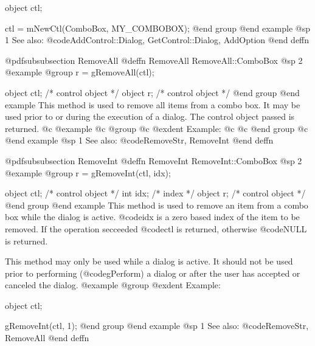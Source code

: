 object  ctl;

ctl = mNewCtl(ComboBox, MY_COMBOBOX);
@end group
@end example
@sp 1
See also:  @code{AddControl::Dialog, GetControl::Dialog, AddOption}
@end deffn




















@pdfsubsubsection {RemoveAll}
@deffn {RemoveAll} RemoveAll::ComboBox
@sp 2
@example
@group
r = gRemoveAll(ctl);

object  ctl;    /*  control object  */
object  r;      /*  control object  */
@end group
@end example
This method is used to remove all items from a combo box.  It may be used
prior to or during the execution of a dialog.  The control object passed
is returned.
@c @example
@c @group
@c @exdent Example:
@c 
@c @end group
@c @end example
@sp 1
See also:  @code{RemoveStr, RemoveInt}
@end deffn

















@pdfsubsubsection {RemoveInt}
@deffn {RemoveInt} RemoveInt::ComboBox
@sp 2
@example
@group
r = gRemoveInt(ctl, idx);

object  ctl;    /*  control object  */
int     idx;    /*  index           */
object  r;      /*  control object  */
@end group
@end example
This method is used to remove an item from a combo box while the dialog
is active.  @code{idx} is a zero based index of the item to be removed.
If the operation secceeded @code{ctl} is returned, otherwise @code{NULL}
is returned.

This method may only be used while a dialog is active.  It should not be
used prior to performing (@code{gPerform}) a dialog or after the user
has accepted or canceled the dialog.
@example
@group
@exdent Example:

object  ctl;

gRemoveInt(ctl, 1);
@end group
@end example
@sp 1
See also:  @code{RemoveStr, RemoveAll}
@end deffn














